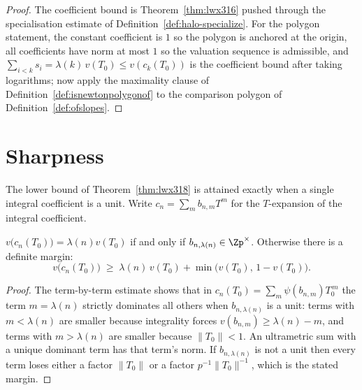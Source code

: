 \begin{proof}
  \leanok
  The coefficient bound is Theorem~\ref{thm:lwx316} pushed through the specialisation estimate of
  Definition~\ref{def:halo-specialize}.  For the polygon statement, the constant coefficient is
  $1$ so the polygon is anchored at the origin, all coefficients have norm at most $1$ so the
  valuation sequence is admissible, and $\sum_{i<k}s_i = \lambda(k)\,v(T_0) \leq
  v(c_k(T_0))$ is the coefficient bound after taking logarithms; now apply the maximality clause
  of Definition~\ref{def:isnewtonpolygonof} to the comparison polygon of
  Definition~\ref{def:ofslopes}.
\end{proof}

\section{Sharpness}

The lower bound of Theorem~\ref{thm:lwx318} is attained exactly when a single integral
coefficient is a unit.  Write $c_n = \sum_m b_{n,m}T^{m}$ for the $T$-expansion of the integral
coefficient.

\begin{theorem}
  \label{thm:lwx-sharp}
  \leanok
  $v\bigl(c_n(T_0)\bigr) = \lambda(n)v(T_0)$ if and only if $b_{n,\lambda(n)} \in \Zp^{\times}$.
  Otherwise there is a definite margin:
  \[
    v\bigl(c_n(T_0)\bigr) \;\geq\; \lambda(n)\,v(T_0) + \min\bigl(v(T_0),\, 1-v(T_0)\bigr).
  \]
\end{theorem}

\begin{proof}
  \leanok
  The term-by-term estimate \cite[(3.18.1)]{LWX} shows that in
  $c_n(T_0) = \sum_m \psi(b_{n,m})T_0^{\,m}$ the term $m = \lambda(n)$ strictly dominates all
  others when $b_{n,\lambda(n)}$ is a unit: terms with $m < \lambda(n)$ are smaller because
  integrality forces $v(b_{n,m}) \geq \lambda(n)-m$, and terms with $m > \lambda(n)$ are smaller
  because $\lVert T_0\rVert<1$.  An ultrametric sum with a unique dominant term has that term's
  norm.  If $b_{n,\lambda(n)}$ is not a unit then every term loses either a factor
  $\lVert T_0\rVert$ or a factor $p^{-1}\lVert T_0\rVert^{-1}$, which is the stated margin.
\end{proof}

